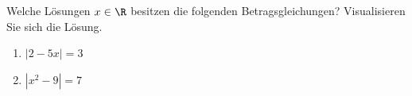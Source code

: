\begin{ExerciseBlock}
Welche Lösungen $x \in \R$ besitzen die folgenden Betragsgleichungen? Visualisieren Sie sich die Lösung.
\begin{enumerate}[label=\alph*)]
	\item $\displaystyle |2-5x|=3$
	\item $\displaystyle |x^2-9|=7$
\end{enumerate}

\end{ExerciseBlock}
